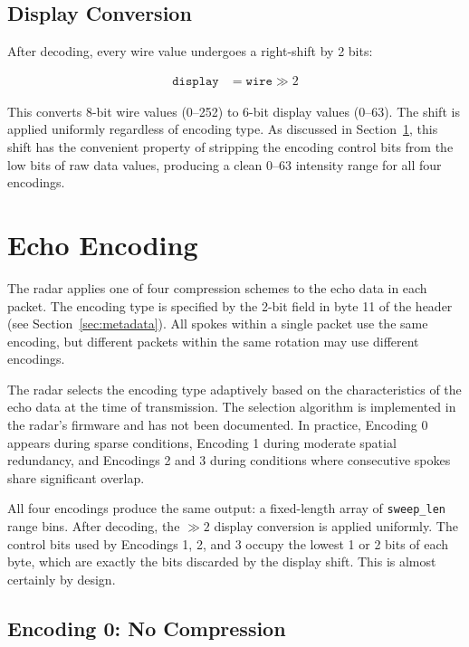 \documentclass[11pt,letterpaper]{article}
\begin{document}
\subsection{Display Conversion}

After decoding, every wire value undergoes a right-shift by 2 bits:

\begin{align}
\texttt{display} &= \texttt{wire} \gg 2
\end{align}

This converts 8-bit wire values (0--252) to 6-bit display values (0--63). The shift is applied uniformly regardless of encoding type. As discussed in Section~\ref{sec:encoding}, this shift has the convenient property of stripping the encoding control bits from the low bits of raw data values, producing a clean 0--63 intensity range for all four encodings.


\section{Echo Encoding}
\label{sec:encoding}

The radar applies one of four compression schemes to the echo data in each packet. The encoding type is specified by the 2-bit field in byte 11 of the header (see Section~\ref{sec:metadata}). All spokes within a single packet use the same encoding, but different packets within the same rotation may use different encodings.

The radar selects the encoding type adaptively based on the characteristics of the echo data at the time of transmission. The selection algorithm is implemented in the radar's firmware and has not been documented. In practice, Encoding 0 appears during sparse conditions, Encoding 1 during moderate spatial redundancy, and Encodings 2 and 3 during conditions where consecutive spokes share significant overlap.

All four encodings produce the same output: a fixed-length array of \texttt{sweep\_len} range bins. After decoding, the $\gg 2$ display conversion is applied uniformly. The control bits used by Encodings 1, 2, and 3 occupy the lowest 1 or 2 bits of each byte, which are exactly the bits discarded by the display shift. This is almost certainly by design.

\subsection{Encoding 0: No Compression}
\label{subsec:enc0}
\end{document}

